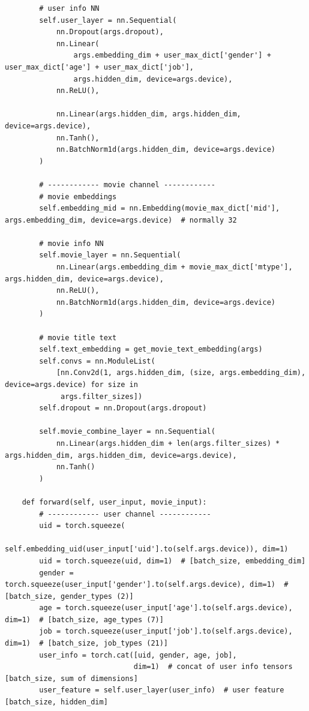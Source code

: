 \begin{spacing}{1.5}
\begin{lstlisting}
        # user info NN
        self.user_layer = nn.Sequential(
            nn.Dropout(args.dropout),
            nn.Linear(
                args.embedding_dim + user_max_dict['gender'] + user_max_dict['age'] + user_max_dict['job'],
                args.hidden_dim, device=args.device),
            nn.ReLU(),
            
            nn.Linear(args.hidden_dim, args.hidden_dim, device=args.device),
            nn.Tanh(),
            nn.BatchNorm1d(args.hidden_dim, device=args.device)
        )
        
        # ------------ movie channel ------------
        # movie embeddings
        self.embedding_mid = nn.Embedding(movie_max_dict['mid'], args.embedding_dim, device=args.device)  # normally 32
        
        # movie info NN
        self.movie_layer = nn.Sequential(
            nn.Linear(args.embedding_dim + movie_max_dict['mtype'], args.hidden_dim, device=args.device),
            nn.ReLU(),
            nn.BatchNorm1d(args.hidden_dim, device=args.device)
        )
        
        # movie title text
        self.text_embedding = get_movie_text_embedding(args)
        self.convs = nn.ModuleList(
            [nn.Conv2d(1, args.hidden_dim, (size, args.embedding_dim), device=args.device) for size in
             args.filter_sizes])
        self.dropout = nn.Dropout(args.dropout)
        
        self.movie_combine_layer = nn.Sequential(
            nn.Linear(args.hidden_dim + len(args.filter_sizes) * args.hidden_dim, args.hidden_dim, device=args.device),
            nn.Tanh()
        )
    
    def forward(self, user_input, movie_input):
        # ------------ user channel ------------
        uid = torch.squeeze(
            self.embedding_uid(user_input['uid'].to(self.args.device)), dim=1)
        uid = torch.squeeze(uid, dim=1)  # [batch_size, embedding_dim]
        gender = torch.squeeze(user_input['gender'].to(self.args.device), dim=1)  # [batch_size, gender_types (2)]
        age = torch.squeeze(user_input['age'].to(self.args.device), dim=1)  # [batch_size, age_types (7)]
        job = torch.squeeze(user_input['job'].to(self.args.device), dim=1)  # [batch_size, job_types (21)]
        user_info = torch.cat([uid, gender, age, job],
                              dim=1)  # concat of user info tensors  [batch_size, sum of dimensions]
        user_feature = self.user_layer(user_info)  # user feature  [batch_size, hidden_dim]
        

\end{lstlisting}
\end{spacing}
